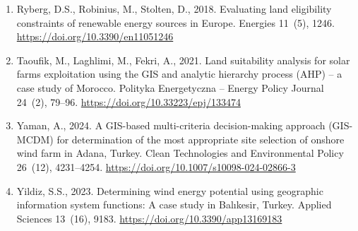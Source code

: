 \begin{enumerate}
\item Ryberg, D.S., Robinius, M., Stolten, D., 2018. Evaluating land eligibility constraints of renewable energy sources in Europe. Energies 11~(5), 1246. \url{https://doi.org/10.3390/en11051246}
\item Taoufik, M., Laghlimi, M., Fekri, A., 2021. Land suitability analysis for solar farms exploitation using the GIS and analytic hierarchy process (AHP) -- a case study of Morocco. Polityka Energetyczna -- Energy Policy Journal 24~(2), 79--96. \url{https://doi.org/10.33223/epj/133474}
\item Yaman, A., 2024. A GIS-based multi-criteria decision-making approach (GIS-MCDM) for determination of the most appropriate site selection of onshore wind farm in Adana, Turkey. Clean Technologies and Environmental Policy 26~(12), 4231--4254. \url{https://doi.org/10.1007/s10098-024-02866-3}
\item Yildiz, S.S., 2023. Determining wind energy potential using geographic information system functions: A case study in Bal{\i}kesir, Turkey. Applied Sciences 13~(16), 9183. \url{https://doi.org/10.3390/app13169183}
\end{enumerate}
